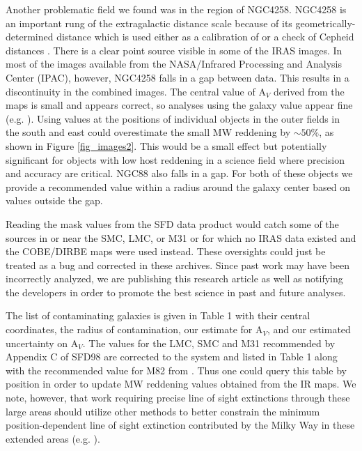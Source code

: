 \documentclass[twocolumn]{aastex63}
\begin{document}
Another problematic field we found was in the region of NGC4258.  NGC4258 is an important rung of the extragalactic distance scale because of its geometrically-determined distance which is used either as a calibration of or a check of Cepheid distances \citep{Macri_etal_2006, Humphreys_etal_2013,Hoffmann_etal_2016, Reid_etal_2019}.
There is a clear point source visible in some of the IRAS images.  In most of the images available from the NASA/Infrared Processing and Analysis Center (IPAC), however, NGC4258 falls in a gap between data.  This results in a discontinuity in the combined images.  The central value of A$_V$ derived from the maps is small and appears correct, so analyses using the galaxy value appear fine (e.g. \citealp{Macri_etal_2006}).  Using values at the positions of individual objects in the outer fields in the south and east could overestimate the small MW reddening by $\sim50\%$, as shown in  Figure \ref{fig_images2}.  This would be a small effect but potentially significant for objects with low host reddening in a science field where precision and accuracy are critical.  NGC88 also falls in a gap.  For both of these objects we provide a recommended value within a radius around the galaxy center based on values outside the gap.

 Reading the mask values from the SFD data product would catch some of the sources in or near the SMC, LMC, or M31 or for which no IRAS data existed and the COBE/DIRBE maps were used instead. 
These oversights could just be treated as a bug and corrected in these archives.  Since past work may have been incorrectly analyzed, we are publishing this research article as well as notifying the developers in order to promote the best science in past and future analyses.  

The list of contaminating galaxies is given in Table 1 with their central coordinates, the radius of contamination, our estimate for A$_V$, and our estimated uncertainty on A$_V$. 
The values for the LMC, SMC and M31 recommended by Appendix C of SFD98 are corrected to the \citet{Schlafly_Finkbeiner_2011} system and listed in Table 1 along with the recommended value for M82 from \citet{Dalcanton_etal_2009}.  Thus one could query this table by position in order to update MW reddening values obtained from the IR maps.  We note, however, that work requiring precise line of sight extinctions through these large areas should utilize other methods to better constrain the minimum position-dependent line of sight extinction contributed by the Milky Way in these extended areas (e.g. \citealp{Haschke_etal_2011}).
\end{document}
